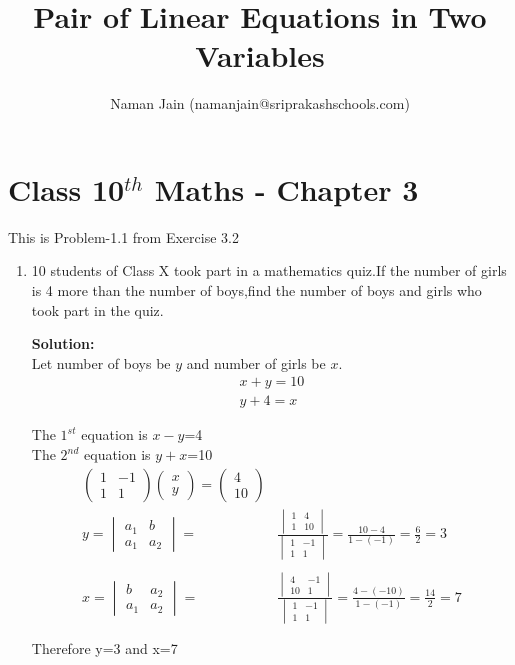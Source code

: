 \documentclass[10pt]{article}
\title{Pair of Linear Equations in Two Variables}
\author{Naman Jain  (namanjain@sriprakashschools.com)}
\newcommand{\myvec}[1]{\ensuremath{\begin{pmatrix}#1\end{pmatrix}}}
\newcommand{\mydet}[1]{\ensuremath{\begin{vmatrix}#1\end{vmatrix}}}
\newcommand{\solution}{\noindent \textbf{Solution: }}
\begin{document}
\maketitle
\section*{Class 10$^{th}$ Maths - Chapter 3}
This is Problem-1.1 from Exercise 3.2
\begin{enumerate}
\item 10 students of Class X took part in a mathematics quiz.If the number of girls is 4 more than the number of boys,find the number of boys and girls who took part in the quiz.
	
\solution \\
Let number of boys be $y$ and number of girls be $x$.\\
\begin{align}
x+y=10\\
y+4=x
\end{align}

The $1^{st}$ equation is $x-y$=4\\
The $2^{nd}$ equation is $y+x$=10\\
\begin{align}
\myvec{1&-1\\1&1} \myvec{x\\y}=\myvec{4\\10}\\
y=\mydet{ a_1 & b\\a_1 & a_2} =&
\frac{\mydet{ 1 & 4\\1 & 10}}{\mydet{ 1 & -1\\1 & 1}}
=\frac{10-4}{1-(-1)}
=\frac{6}{2}
=3 \\ \\
x=\mydet{ b & a_2\\a_1 & a_2} =&
\frac{\mydet{ 4 & -1\\10 & 1}}{\mydet{ 1 & -1\\1 & 1}}
=\frac{4-(-10)}{1-(-1)}
=\frac{14}{2}
=7\\ \\
\end{align}
Therefore  y=3 and x=7
\end{enumerate}
\end{document}
